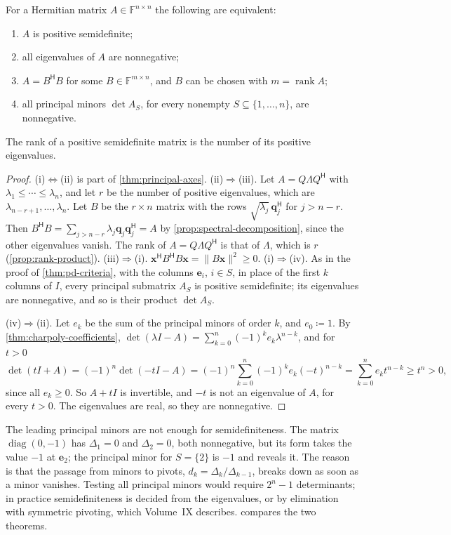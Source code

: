 \begin{theorem}
\label{thm:psd-criteria}
For a Hermitian matrix $A\in\mathbb F^{n\times n}$ the following are equivalent:
\begin{enumerate}
\item $A$ is positive semidefinite;
\item all eigenvalues of $A$ are nonnegative;
\item $A=B^{\mathsf H}B$ for some $B\in\mathbb F^{m\times n}$, and $B$ can be chosen with $m=\operatorname{rank}A$;
\item all principal minors $\det A_S$, for every nonempty $S\subseteq\{1,\ldots,n\}$, are nonnegative.
\end{enumerate}
The rank of a positive semidefinite matrix is the number of its positive eigenvalues.
\end{theorem}

\begin{proof}
(i)$\Leftrightarrow$(ii) is part of \cref{thm:principal-axes}. (ii)$\Rightarrow$(iii). Let $A=Q\Lambda Q^{\mathsf H}$ with $\lambda_1\le\cdots\le\lambda_n$, and let $r$ be the number of positive eigenvalues, which are $\lambda_{n-r+1},\ldots,\lambda_n$. Let $B$ be the $r\times n$ matrix with the rows $\sqrt{\lambda_j}\,\mathbf q_j^{\mathsf H}$ for $j>n-r$. Then $B^{\mathsf H}B=\sum_{j>n-r}\lambda_j\mathbf q_j\mathbf q_j^{\mathsf H}=A$ by \cref{prop:spectral-decomposition}, since the other eigenvalues vanish. The rank of $A=Q\Lambda Q^{\mathsf H}$ is that of $\Lambda$, which is $r$ (\cref{prop:rank-product}). (iii)$\Rightarrow$(i). $\mathbf x^{\mathsf H}B^{\mathsf H}B\mathbf x=\|B\mathbf x\|^2\ge0$. (i)$\Rightarrow$(iv). As in the proof of \cref{thm:pd-criteria}, with the columns $\mathbf e_i$, $i\in S$, in place of the first $k$ columns of $I$, every principal submatrix $A_S$ is positive semidefinite; its eigenvalues are nonnegative, and so is their product $\det A_S$.

(iv)$\Rightarrow$(ii). Let $e_k$ be the sum of the principal minors of order $k$, and $e_0\coloneqq1$. By \cref{thm:charpoly-coefficients}, $\det(\lambda I-A)=\sum_{k=0}^n(-1)^ke_k\lambda^{n-k}$, and for $t>0$
\[
\det(tI+A)=(-1)^n\det(-tI-A)=(-1)^n\sum_{k=0}^n(-1)^ke_k(-t)^{n-k}=\sum_{k=0}^ne_kt^{n-k}\ge t^n>0 ,
\]
since all $e_k\ge0$. So $A+tI$ is invertible, and $-t$ is not an eigenvalue of $A$, for every $t>0$. The eigenvalues are real, so they are nonnegative.
\end{proof}

The leading principal minors are not enough for semidefiniteness. The matrix $\operatorname{diag}(0,-1)$ has $\Delta_1=0$ and $\Delta_2=0$, both nonnegative, but its form takes the value $-1$ at $\mathbf e_2$; the principal minor for $S=\{2\}$ is $-1$ and reveals it. The reason is that the passage from minors to pivots, $d_k=\Delta_k/\Delta_{k-1}$, breaks down as soon as a minor vanishes. Testing all principal minors would require $2^n-1$ determinants; in practice semidefiniteness is decided from the eigenvalues, or by elimination with symmetric pivoting, which Volume~IX describes.  compares the two theorems.


